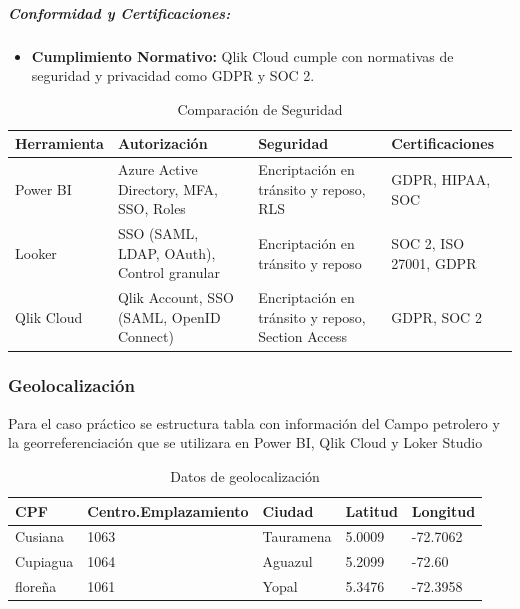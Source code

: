\documentclass[
  11pt,
  bookmarksnumbered]{article}
\providecommand{\tightlist}{%
  \setlength{\itemsep}{0pt}\setlength{\parskip}{0pt}}
\begin{document}
\hypertarget{conformidad-y-certificaciones-2}{%
\subparagraph{Conformidad y Certificaciones:}\label{conformidad-y-certificaciones-2}}

\begin{itemize}
\tightlist
\item
  \textbf{Cumplimiento Normativo:} Qlik Cloud cumple con normativas de seguridad y privacidad como GDPR y SOC 2.
\end{itemize}

\begin{table}[H]

\caption{\label{tab:unnamed-chunk-22}Comparación de Seguridad}
\centering
\fontsize{9}{11}\selectfont
\begin{tabular}[t]{>{\raggedright\arraybackslash}p{10em}|>{\raggedright\arraybackslash}p{10em}|>{\raggedright\arraybackslash}p{10em}|>{\raggedright\arraybackslash}p{10em}}
\hline
Herramienta & Autorización & Seguridad & Certificaciones\\
\hline
Power BI & Azure Active Directory, MFA, SSO, Roles & Encriptación en tránsito y reposo, RLS & GDPR, HIPAA, SOC\\
\hline
Looker & SSO (SAML, LDAP, OAuth), Control granular & Encriptación en tránsito y reposo & SOC 2, ISO 27001, GDPR\\
\hline
Qlik Cloud & Qlik Account, SSO (SAML, OpenID Connect) & Encriptación en tránsito y reposo, Section Access & GDPR, SOC 2\\
\hline
\end{tabular}
\end{table}

\hypertarget{geolocalizaciuxf3n}{%
\subsubsection{Geolocalización}\label{geolocalizaciuxf3n}}

Para el caso práctico se estructura tabla con información del Campo petrolero y la georreferenciación que se utilizara en Power BI, Qlik Cloud y Loker Studio

\begin{table}[H]

\caption{\label{tab:unnamed-chunk-23}Datos de geolocalización}
\centering
\fontsize{9}{11}\selectfont
\begin{tabular}[t]{l|l|l|l|l}
\hline
CPF & Centro.Emplazamiento & Ciudad & Latitud & Longitud\\
\hline
Cusiana & 1063 & Tauramena & 5.0009 & -72.7062\\
\hline
Cupiagua & 1064 & Aguazul & 5.2099 & -72.60\\
\hline
floreña & 1061 & Yopal & 5.3476 & -72.3958\\
\hline
\end{tabular}
\end{table}
\end{document}
